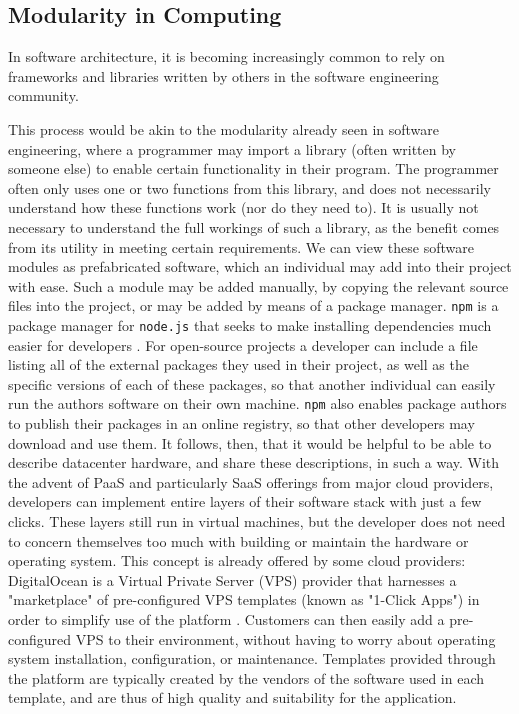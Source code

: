 \documentclass[11pt]{article}
\begin{document}
	\subsection{Modularity in Computing}
		In software architecture, it is becoming increasingly common to rely on frameworks and libraries written by others in the software engineering community. 

		This process would be akin to the modularity already seen in software engineering, where a programmer may import a library (often written by someone else) to enable certain functionality in their program. 
		The programmer often only uses one or two functions from this library, and does not necessarily understand how these functions work (nor do they need to).
		It is usually not necessary to understand the full workings of such a library, as the benefit comes from its utility in meeting certain requirements. 
		We can view these software modules as prefabricated software, which an individual may add into their project with ease. 
		Such a module may be added manually, by copying the relevant source files into the project, or may be added by means of a package manager.
		\verb|npm| is a package manager for \verb|node.js| that seeks to make installing dependencies much easier for developers \cite{Wittern2016}.
		For open-source projects a developer can include a file listing all of the external packages they used in their project, as well as the specific versions of each of these packages, so that another individual can easily run the authors software on their own machine.
		\verb|npm| also enables package authors to publish their packages in an online registry, so that other developers may download and use them.
		It follows, then, that it would be helpful to be able to describe datacenter hardware, and share these descriptions, in such a way. 
		With the advent of PaaS and particularly SaaS offerings from major cloud providers, developers can implement entire layers of their software stack with just a few clicks. 
		These layers still run in virtual machines, but the developer does not need to concern themselves too much with building or maintain the hardware or operating system.
		This concept is already offered by some cloud providers: DigitalOcean is a Virtual Private Server (VPS) provider that harnesses a "marketplace" of pre-configured VPS templates (known as "1-Click Apps") in order to simplify use of the platform \cite{DigitalOcean2020}. 
		Customers can then easily add a pre-configured VPS to their environment, without having to worry about operating system installation, configuration, or maintenance. 
		Templates provided through the platform are typically created by the vendors of the software used in each template, and are thus of high quality and suitability for the application.
	
\end{document}
